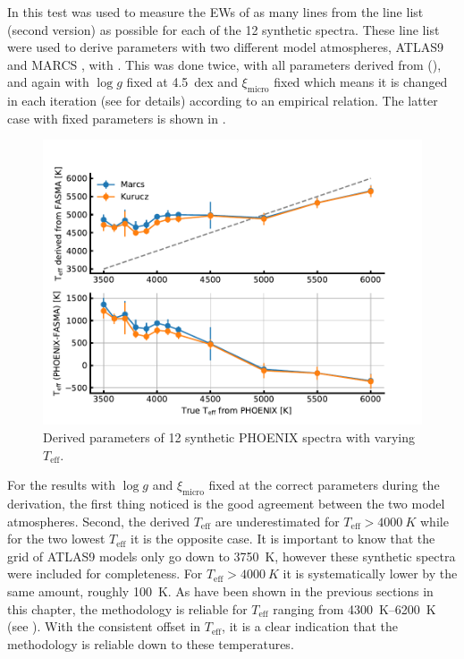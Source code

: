 In this test  was used to measure the EWs of as many lines from the line list (second
version) as possible for each of the 12 synthetic spectra. These line list were used to derive
parameters with two different model atmospheres, ATLAS9 \citep{Kurucz1993} and MARCS
\citep{Gustafson2008}, with . This was done twice, with all parameters derived from
 (), and again with $\log g$ fixed at \SI{4.5}{dex} and
$\xi_\mathrm{micro}$ fixed which means it is changed in each iteration (see 
for details) according to an empirical relation. The latter case with fixed parameters is shown in
.

\begin{figure}[htpb!]
    \centering
    \includegraphics[width=1.0\linewidth]{figures/simulated_teff_free.pdf}
    \caption{Derived parameters of 12 synthetic PHOENIX spectra with varying $T_\mathrm{eff}$.}
    \label{fig:phoenix_free}
\end{figure}

For the results with $\log g$ and $\xi_\mathrm{micro}$ fixed at the correct parameters during the
derivation, the first thing noticed is the good agreement between the two model atmospheres. Second,
the derived $T_\mathrm{eff}$ are underestimated for $T_\mathrm{eff}>\SI{4000}{K}$ while for the two
lowest $T_\mathrm{eff}$ it is the opposite case. It is important to know that the grid of ATLAS9
models only go down to \SI{3750}{K}, however these synthetic spectra were included for completeness.
For $T_\mathrm{eff}>\SI{4000}{K}$ it is systematically lower by the same amount, roughly
\SI{100}{K}. As have been shown in the previous sections in this chapter, the methodology is
reliable for $T_\mathrm{eff}$ ranging from \SIrange{4300}{6200}{K} (see ). With
the consistent offset in $T_\mathrm{eff}$, it is a clear indication that the methodology is reliable
down to these temperatures.

